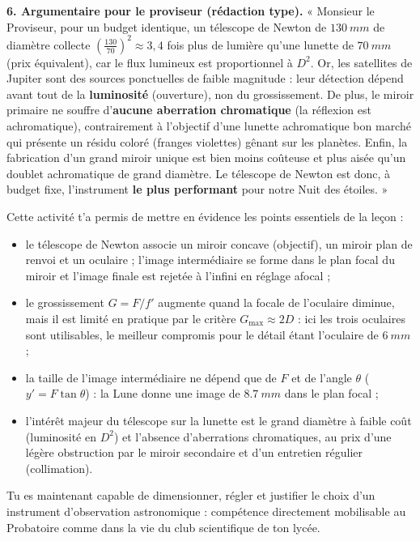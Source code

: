 \documentclass[11pt]{article}
\newcommand{\cle}[1]{{\popxbold\color{popdark}#1}}
\newcounter{popsec}
\newcounter{popsub}
\newcommand{\courssub}[1]{%
  \stepcounter{popsub}%
  \par\vspace{9pt}\noindent{\popxbold\fontsize{11.5}{13}\selectfont\color{popink}{\color{poporange}\thepopsec.\thepopsub}\hspace{6pt}#1}\par\nopagebreak\vspace{4pt}
}
\begin{document}
\begin{exoresolu}
\textbf{6. Argumentaire pour le proviseur (rédaction type).}
« Monsieur le Proviseur, pour un budget identique, un télescope de Newton de $\SI{130}{mm}$ de diamètre collecte $\left(\frac{130}{70}\right)^2 \approx 3,4$ fois plus de lumière qu'une lunette de $\SI{70}{mm}$ (prix équivalent), car le flux lumineux est proportionnel à $D^2$. Or, les satellites de Jupiter sont des sources ponctuelles de faible magnitude : leur détection dépend avant tout de la \textbf{luminosité} (ouverture), non du grossissement. De plus, le miroir primaire ne souffre d'\textbf{aucune aberration chromatique} (la réflexion est achromatique), contrairement à l'objectif d'une lunette achromatique bon marché qui présente un résidu coloré (franges violettes) gênant sur les planètes. Enfin, la fabrication d'un grand miroir unique est bien moins coûteuse et plus aisée qu'un doublet achromatique de grand diamètre. Le télescope de Newton est donc, à budget fixe, l'instrument \textbf{le plus performant} pour notre Nuit des étoiles. »
\end{exoresolu}

\courssub{Bilan de l'activité}

Cette activité t'a permis de mettre en évidence les points essentiels de la leçon :
\begin{itemize}
\item le télescope de Newton associe un \cle{miroir concave} (objectif), un \cle{miroir plan} de renvoi et un \cle{oculaire} ; l'image intermédiaire se forme dans le plan focal du miroir et l'image finale est rejetée à l'infini en réglage afocal ;
\item le \cle{grossissement} $G = F/f'$ augmente quand la focale de l'oculaire diminue, mais il est limité en pratique par le critère $G_{\max} \approx 2D$ : ici les trois oculaires sont utilisables, le meilleur compromis pour le détail étant l'oculaire de $\SI{6}{mm}$ ;
\item la taille de l'image intermédiaire ne dépend que de $F$ et de l'angle $\theta$ ($y' = F\tan\theta$) : la Lune donne une image de $\SI{8,7}{mm}$ dans le plan focal ;
\item l'intérêt majeur du télescope sur la lunette est le \cle{grand diamètre à faible coût} (luminosité en $D^2$) et l'\cle{absence d'aberrations chromatiques}, au prix d'une légère obstruction par le miroir secondaire et d'un entretien régulier (collimation).
\end{itemize}
Tu es maintenant capable de dimensionner, régler et justifier le choix d'un instrument d'observation astronomique : compétence directement mobilisable au Probatoire comme dans la vie du club scientifique de ton lycée.
\end{document}
